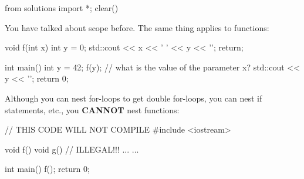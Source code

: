 \begin{python0}
from solutions import *; clear()
\end{python0}

You have talked about scope before. The same thing applies to functions:

\begin{consolethree}[escapeinside=||]
void f(int x)
{
    int y = 0;
    std::cout << x << ' ' << y << '\n';
    return;
}

int main()
{
    int y = 42;
    f(y); // what is the value of the parameter x?
    std::cout << y << '\n';
    return 0;
}
\end{consolethree}

Although you can nest for-loops to get double for-loops, you can nest if
statements, etc., you \textbf{CANNOT} nest functions:

\begin{consolethree}[escapeinside=||]
// THIS CODE WILL NOT COMPILE
#include <iostream>

void f()
{
    void g() // ILLEGAL!!!
    {
        ...
    }
    ...
}

int main()
{
    f();
    return 0;
}
\end{consolethree}


